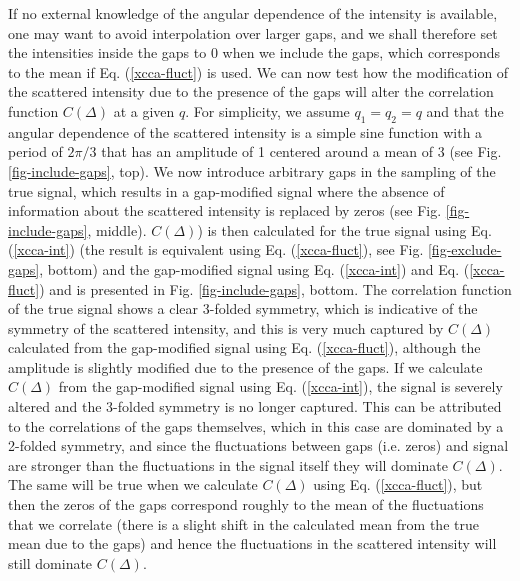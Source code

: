 \documentclass[12pt]{article}
\begin{document}
If no external knowledge of the angular dependence of the intensity is available, one may want to avoid interpolation over larger gaps, and we shall therefore set the intensities inside the gaps to 0 when we include the gaps, which corresponds to the mean if Eq. (\ref{xcca-fluct}) is used. We can now test how the modification of the scattered intensity due to the presence of the gaps will alter the correlation function $C(\Delta)$ at a given $q$. For simplicity, we assume $q_1 = q_2 = q$ and that the angular dependence of the scattered intensity is a simple sine function with a period of $2\pi/3$ that has an amplitude of 1 centered around a mean of 3 (see Fig. \ref{fig-include-gaps}, top). We now introduce arbitrary gaps in the sampling of the true signal, which results in a gap-modified signal where the absence of information about the scattered intensity is replaced by zeros (see Fig. \ref{fig-include-gaps}, middle). $C(\Delta)$) is then calculated for the true signal using Eq. (\ref{xcca-int}) (the result is equivalent using Eq. (\ref{xcca-fluct}), see Fig. \ref{fig-exclude-gaps}, bottom) and the gap-modified signal using Eq. (\ref{xcca-int}) and Eq. (\ref{xcca-fluct}) and is presented in Fig. \ref{fig-include-gaps}, bottom. The correlation function of the true signal shows a clear 3-folded symmetry, which is indicative of the symmetry of the scattered intensity, and this is very much captured by $C(\Delta)$ calculated from the gap-modified signal using Eq. (\ref{xcca-fluct}), although the amplitude is slightly modified due to the presence of the gaps. If we calculate $C(\Delta)$ from the gap-modified signal using Eq. (\ref{xcca-int}), the signal is severely altered and the 3-folded symmetry is no longer captured. This can be attributed to the correlations of the gaps themselves, which in this case are dominated by a 2-folded symmetry, and since the fluctuations between gaps (i.e. zeros) and signal are stronger than the fluctuations in the signal itself they will dominate $C(\Delta)$. The same will be true when we calculate $C(\Delta)$ using Eq. (\ref{xcca-fluct}), but then the zeros of the gaps correspond roughly to the mean of the fluctuations that we correlate (there is a slight shift in the calculated mean from the true mean due to the gaps) and hence the fluctuations in the scattered intensity will still dominate $C(\Delta)$.
\end{document}
